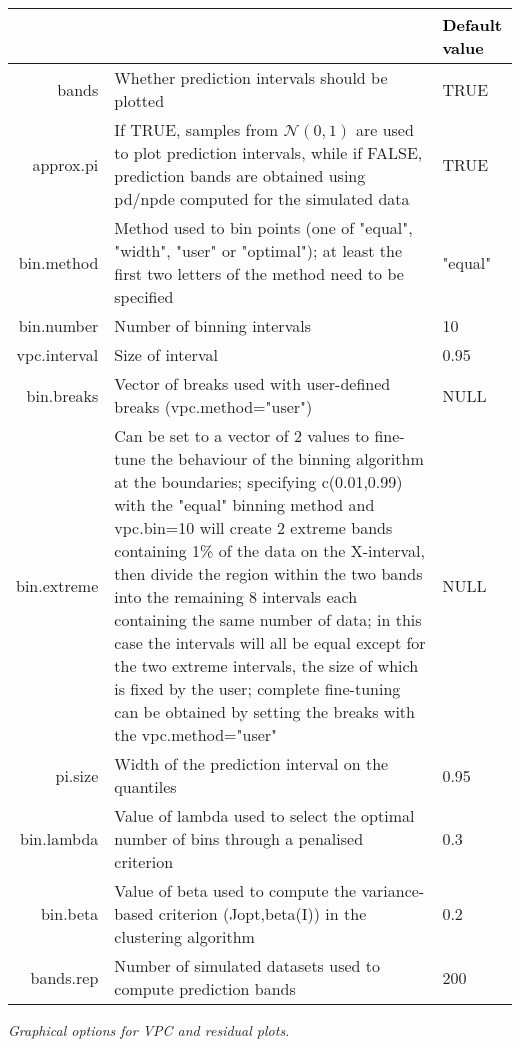 \begin{table}[!h] 
\begin{center}
\begin{tabular}{|r p{10cm} p{3cm} |}
\hline
\centering{\textbf{\textcolor{black}{Parameter}} }& \centering{\textbf{\textcolor{black}{Description }}} & \textbf{\textcolor{black}{Default value}} \\
\hline
{\ttfamily bands} & Whether prediction intervals should be plotted & TRUE \\
{\ttfamily approx.pi} & If TRUE, samples from $\mathcal{N}(0,1)$ are used to plot prediction intervals, while if FALSE, prediction bands are obtained using pd/npde computed for the simulated data & TRUE \\
{\ttfamily bin.method} & Method used to bin points (one of "equal", "width", "user" or "optimal"); at least the first two letters of the method need to be specified & "equal" \\
{\ttfamily bin.number} & Number of binning intervals & 10 \\
{\ttfamily vpc.interval} & Size of interval & 0.95 \\
{\ttfamily bin.breaks} & Vector of breaks used with user-defined breaks (vpc.method="user") & NULL \\
{\ttfamily bin.extreme} & Can be set to a vector of 2 values to fine-tune the behaviour of the binning algorithm at the boundaries; specifying c(0.01,0.99) with the "equal" binning method and vpc.bin=10 will create 2 extreme bands containing 1\% of the data on the X-interval, then divide the region within the two bands into the remaining 8 intervals each containing the same number of data; in this case the intervals will all be equal except for the two extreme intervals, the size of which is fixed by the user; complete fine-tuning can be obtained by setting the breaks with the vpc.method="user" & NULL \\
{\ttfamily pi.size} & Width of the prediction interval on the quantiles & 0.95 \\
{\ttfamily bin.lambda} & Value of lambda used to select the optimal number of bins through a penalised criterion & 0.3 \\
{\ttfamily bin.beta} & Value of beta used to compute the variance-based criterion (Jopt,beta(I)) in the clustering algorithm & 0.2 \\
{\ttfamily bands.rep} & Number of simulated datasets used to compute prediction bands & 200 \\
\hline
\end{tabular} 
\end{center}
 {\itshape Graphical options for VPC and residual plots.} %
\end{table} 

